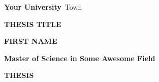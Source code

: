 \begin{titlepage}
\pagestyle{empty}
\begin{center}

\huge{\textbf{Your University}~Town}

\vspace{7cm}
\small{\textbf{THESIS TITLE}}

\vspace{3cm}
\small{\textbf{FIRST NAME}}

\vspace{3cm}
\small{\textbf{Master of Science in Some Awesome Field}}

\vspace{3cm}
\Large{\textbf{THESIS}}

\end{center}
\end{titlepage}
